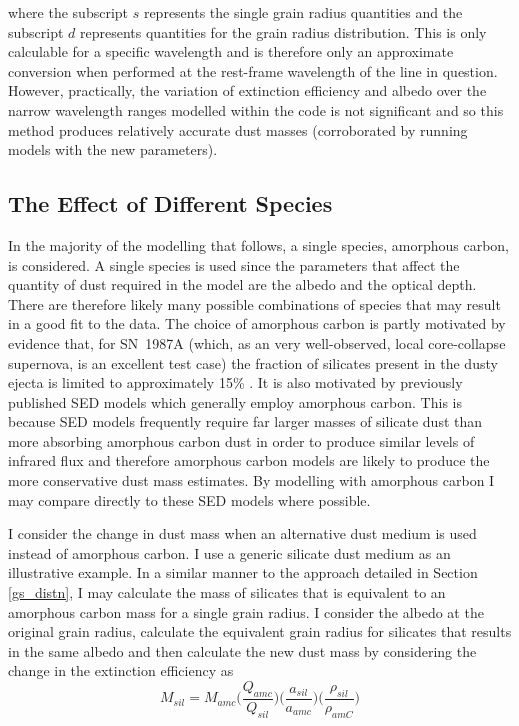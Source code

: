 where the subscript $s$ represents the single grain radius quantities and the subscript  $d$ represents quantities for the grain radius distribution.  This is only calculable for a specific wavelength and is therefore only an approximate conversion when performed at the rest-frame wavelength of the line in question.  However, practically, the variation of extinction efficiency and albedo over the narrow wavelength ranges modelled within the code is not significant and so this method produces relatively accurate dust masses (corroborated by running models with the new parameters).

\subsection{The Effect of Different Species}
In the majority of the modelling that follows, a single species, amorphous carbon, is considered.   A single species is used since the parameters that affect the quantity of dust required in the model are the albedo and the optical depth.  There are therefore  likely many possible combinations of species that may result in a good fit to the data.  The choice of amorphous carbon is partly motivated by evidence that, for SN~1987A (which, as an very well-observed, local core-collapse supernova, is an excellent test case) the fraction of silicates present in the dusty ejecta is limited to approximately 15\% \citep{Ercolano2007,Wesson2015}.  It is also motivated by previously published SED models which generally employ amorphous carbon.  This is because SED models frequently require far larger masses of silicate dust than more absorbing amorphous carbon dust in order to produce similar levels of infrared flux and therefore amorphous carbon models are likely to produce the more conservative dust mass estimates.  By modelling with amorphous carbon I may compare directly to these SED models where possible.

I consider the change in dust mass when an alternative dust medium is used instead of amorphous carbon.  I use a generic silicate dust medium as an illustrative example.
 In a similar manner to the approach detailed in Section \ref{gs_distn}, I may calculate the mass of silicates that is equivalent to an amorphous carbon mass for a single grain radius.  I consider the albedo at the original grain radius, calculate the equivalent grain radius for silicates that results in the same albedo and then calculate the new dust mass by considering the change in the extinction efficiency as
\begin{equation}
\label{species_conversion}
M_{sil} = M_{amc} \Big( \frac{Q_{amc}}{Q_{sil}} \Big) \Big(\frac{a_{sil}}{a_{amc}}\Big) \Big(\frac{\rho_{sil}}{\rho_{amC}}\Big)
\end{equation}

